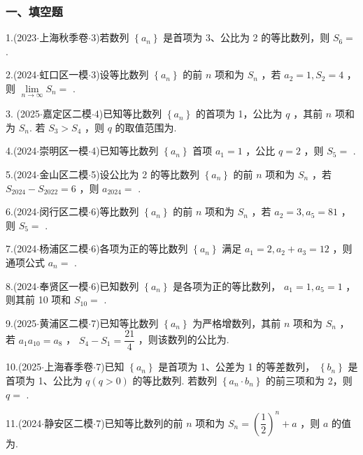 \subsubsection*{一、填空题}

1.(2023$\cdot$上海秋季卷$\cdot$3)若数列 $\left\{  {a}_{n}\right\}$ 是首项为 3、公比为 2 的等比数列，则 ${S}_{6} =$ \blkda[2]{}.

2.(2024$\cdot$虹口区一模$\cdot$3)设等比数列 $\left\{  {a}_{n}\right\}$ 的前 $n$ 项和为 ${S}_{n}$ ，若 ${a}_{2} = 1,{S}_{2} = 4$ ，则 $\mathop{\lim }\limits_{{n \rightarrow  \infty }}{S}_{n} =$ \blkda[2]{}.

3. (2025$\cdot$嘉定区二模$\cdot$4)已知等比数列 $\left\{  {a}_{n}\right\}$ 的首项为 1，公比为 $q$ ，其前 $n$ 项和为 ${S}_{n}$. 若 ${S}_{3} > {S}_{4}$ ，则 $q$ 的取值范围为\blkda[2]{}.

4.(2024$\cdot$崇明区一模$\cdot$4)已知等比数列 $\left\{  {a}_{n}\right\}$ 首项 ${a}_{1} = 1$ ，公比 $q = 2$ ，则 ${S}_{5} =$ \blkda[2]{}.

5.(2024$\cdot$金山区二模$\cdot$5)设公比为 2 的等比数列 $\left\{  {a}_{n}\right\}$ 的前 $n$ 项和为 ${S}_{n}$ ，若 ${S}_{2024} - {S}_{2022} = 6$ ，则 ${a}_{2024} =$ \blkda[2]{}.

6.(2024$\cdot$闵行区二模$\cdot$6)等比数列 $\left\{  {a}_{n}\right\}$ 的前 $n$ 项和为 ${S}_{n}$ ，若 ${a}_{2} = 3,{a}_{5} = {81}$ ，则 ${S}_{5} =$ \blkda[2]{}.

7.(2024$\cdot$杨浦区二模$\cdot$6)各项为正的等比数列 $\left\{  {a}_{n}\right\}$ 满足 ${a}_{1} = 2,{a}_{2} + {a}_{3} = {12}$ ，则通项公式 ${a}_{n} =$ \blkda[2]{}.

8.(2024$\cdot$奉贤区一模$\cdot$6)已知数列 $\left\{  {a}_{n}\right\}$ 是各项为正的等比数列， ${a}_{1} = 1,{a}_{5} = 1$ ，则其前 10 项和 ${S}_{10} =$ \blkda[2]{}.

9.(2025$\cdot$黄浦区二模$\cdot$7)已知等比数列 $\left\{  {a}_{n}\right\}$ 为严格增数列，其前 $n$ 项和为 ${S}_{n}$ ，若 ${a}_{1}{a}_{10} = {a}_{8}$ ， ${S}_{4} - {S}_{1} = \dfrac{21}{4}$ ，则该数列的公比为\blkda[2]{}.

10.(2025$\cdot$上海春季卷$\cdot$7)已知 $\left\{  {a}_{n}\right\}$ 是首项为 1、公差为 1 的等差数列， $\left\{  {b}_{n}\right\}$ 是首项为 1、公比为 $q  \left( {q > 0}\right)$ 的等比数列. 若数列 $\left\{  {{a}_{n} \cdot  {b}_{n}}\right\}$ 的前三项和为 2，则 $q =$ \blkda[2]{}.

11.(2024$\cdot$静安区二模$\cdot$7)已知等比数列的前 $n$ 项和为 ${S}_{n} = {\left( \dfrac{1}{2}\right) }^{n} + a$ ，则 $a$ 的值为\blkda[2]{}.

